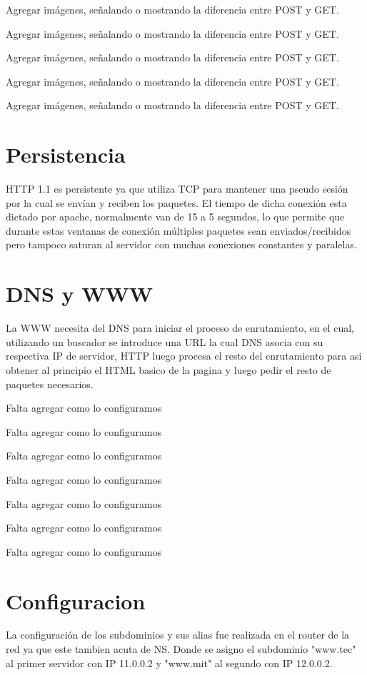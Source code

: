 \documentclass[12pt,a4paper]{article}
\begin{document}
	Agregar imágenes, señalando o mostrando la diferencia entre POST y GET.
	
	Agregar imágenes, señalando o mostrando la diferencia entre POST y GET.
	
	Agregar imágenes, señalando o mostrando la diferencia entre POST y GET.
	
	Agregar imágenes, señalando o mostrando la diferencia entre POST y GET.
	
	Agregar imágenes, señalando o mostrando la diferencia entre POST y GET.
	
	\section{Persistencia}
	HTTP 1.1 es persistente ya que utiliza TCP para mantener una pseudo sesión por la cual se envían y reciben los paquetes. El tiempo de dicha conexión esta dictado por apache, normalmente van de 15 a 5 segundos, lo que permite que durante estas ventanas de conexión múltiples paquetes sean enviados/recibidos pero tampoco saturan al servidor con muchas conexiones constantes y paralelas.
	\section{DNS y WWW}
	La WWW necesita del DNS para iniciar el proceso de enrutamiento, en el cual, utilizando un buscador se introduce una URL la cual DNS asocia con su respectiva IP de servidor, HTTP luego procesa el resto del enrutamiento para asi obtener al principio el HTML basico de la pagina y luego pedir el resto de paquetes necesarios.
	
	Falta agregar como  lo configuramos
	
	Falta agregar como  lo configuramos
	
	Falta agregar como  lo configuramos
	
	Falta agregar como  lo configuramos
	
	Falta agregar como  lo configuramos
	
	Falta agregar como  lo configuramos
	
	Falta agregar como  lo configuramos
	
	\section{Configuracion}
	La configuración de los subdominios y sus alias fue realizada en el router de la red ya que este tambien acuta de NS. Donde se asigno el subdominio "www.tec" al primer servidor con IP 11.0.0.2 y "www.mit" al segundo con IP 12.0.0.2.
	
\end{document}
